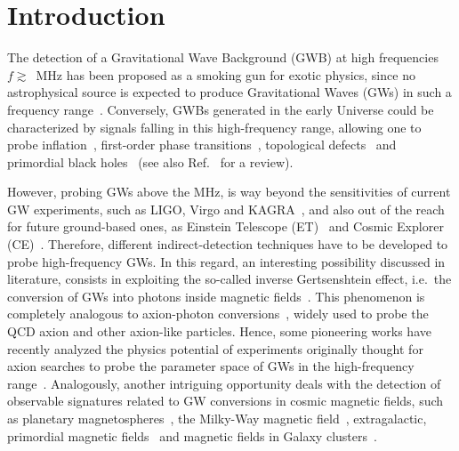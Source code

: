 \documentclass[twocolumn,superscriptaddress,floatfix,preprintnumbers, nofootinbib,hyperref]{revtex4-2}
\begin{document}
\maketitle



\section{Introduction}

The detection of a Gravitational Wave Background (GWB) at high frequencies $f\gtrsim$~MHz has been proposed as a smoking gun for exotic physics, since no astrophysical source is expected to produce Gravitational Waves (GWs) in such a frequency range~\cite{Rosado:2011kv,Sesana:2016ljz,Lamberts:2019nyk,Robson:2018ifk,KAGRA:2021kbb,KAGRA:2021vkt,Babak:2023lro}. Conversely, GWBs generated in the early Universe could be characterized by signals falling in this high-frequency range, allowing one to probe inflation~\cite{Grishchuk:1974ny,Starobinsky:1979ty,Rubakov:1982df,Bartolo:2016ami}, first-order phase transitions~\cite{Caprini:2015zlo,Caprini:2019egz,Hindmarsh:2020hop,Gouttenoire:2022gwi,Athron:2023xlk}, topological defects~\cite{Vilenkin:2000jqa, Blanco-Pillado:2017oxo, Auclair:2019wcv, Gouttenoire:2019kij,Servant:2023tua} and primordial black holes~\cite{Anantua:2008am,Dolgov:2011cq,Dong:2015yjs,Franciolini:2022htd,Gehrman:2022imk,Gehrman:2023esa} (see also Ref.~\cite{Aggarwal:2020olq} for a review).

However, probing GWs above the MHz, is way beyond the sensitivities of current GW experiments, such as LIGO, Virgo and KAGRA~\cite{LIGOScientific:2014qfs,LIGOScientific:2019vic}, and also out of the reach for future ground-based ones, as Einstein Telescope (ET)~\cite{Hild:2010id, Punturo:2010zz} and Cosmic Explorer (CE)~\cite{LIGOScientific:2016wof}. Therefore, different indirect-detection techniques have to be developed to probe high-frequency GWs. In this regard, an interesting possibility discussed in literature, consists in exploiting the so-called inverse Gertsenshtein effect, i.e.~the conversion of GWs into photons inside magnetic fields~\cite{Gertsenshtein:1962kfm,Macedo:1983wcr,Raffelt:1987im,Cruise:2012zz,Dolgov:2012be,Ejlli:2018hke,Ejlli:2019bqj,Ejlli:2020fpt,Cembranos:2023ere}. This phenomenon is completely analogous to axion-photon conversions~\cite{Raffelt:1987im}, widely used to probe the QCD axion and other axion-like particles. Hence, some pioneering works have recently analyzed the physics potential of experiments originally thought for axion searches to probe the parameter space of GWs in the high-frequency range~\cite{Domcke:2022rgu, Domcke:2023bat, Gatti:2024mde}.
Analogously, another intriguing opportunity deals with the detection of observable signatures related to GW conversions in cosmic magnetic fields, such as planetary magnetospheres~\cite{Liu:2023mll,Ito:2023nkq}, the Milky-Way magnetic field~\cite{Ramazanov:2023nxz, Ito:2023nkq}, extragalactic, primordial magnetic fields~\cite{Domcke:2020yzq} and magnetic fields in Galaxy clusters~\cite{He:2023xoh}.
\end{document}
